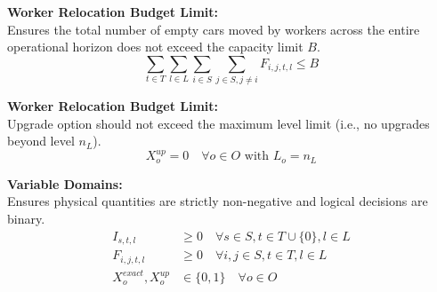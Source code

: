 \documentclass{article}
\begin{document}
\vspace{0.5em}
\textbf{Worker Relocation Budget Limit:} \\
Ensures the total number of empty cars moved by workers across the entire operational horizon does not exceed the capacity limit $B$.
\begin{equation}
\sum_{t \in T} \sum_{l \in L} \sum_{i \in S} \sum_{j \in S, j \neq i} F_{i, j, t, l} \leq B
\end{equation}

\vspace{0.5em}
\textbf{Worker Relocation Budget Limit:} \\
Upgrade option should not exceed the maximum level limit (i.e., no upgrades beyond level $n_L$).
\begin{equation}
X_o^{up} = 0 \quad \forall o \in O \text{ with } L_o = n_L
\end{equation}


\vspace{0.5em}
\textbf{Variable Domains:} \\
Ensures physical quantities are strictly non-negative and logical decisions are binary.
\begin{align}
I_{s, t, l} &\geq 0 \quad \forall s \in S, t \in T \cup \{0\}, l \in L \\
F_{i, j, t, l} &\geq 0 \quad \forall i, j \in S, t \in T, l \in L \\
X_{o}^{exact}, X_{o}^{up} &\in \{0, 1\} \quad \forall o \in O
\end{align}
\end{document}
